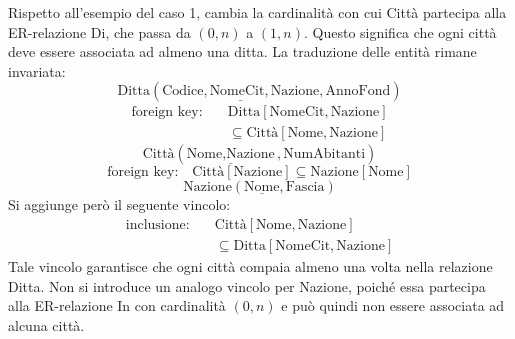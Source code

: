 \noindent
Rispetto all'esempio del caso 1, cambia la
cardinalità con cui Città partecipa alla
ER-relazione Di, che passa da $(0,n)$ a $(1,n)$.
Questo significa che ogni città deve essere
associata ad almeno una ditta.
La traduzione delle entità rimane invariata:
\[
\text{Ditta}(
\underline{\text{Codice},\text{NomeCit},
\text{Nazione}},\text{AnnoFond})
\]
\[
\begin{aligned}
\text{foreign key:}\quad
&\text{Ditta}[\text{NomeCit},\text{Nazione}]\\
&\subseteq
\text{Città}[\text{Nome},\text{Nazione}]
\end{aligned}
\]
\[
\text{Città}(
\underline{\text{Nome},\text{Nazione}},
\text{NumAbitanti})
\]
\[
\text{foreign key:}\quad
\text{Città}[\text{Nazione}]
\subseteq \text{Nazione}[\text{Nome}]
\]
\[
\text{Nazione}(\underline{\text{Nome}},
\text{Fascia})
\]
\noindent
Si aggiunge però il seguente vincolo:
\[
\begin{aligned}
\text{inclusione:}\quad
&\text{Città}[\text{Nome},\text{Nazione}]\\
&\subseteq
\text{Ditta}[\text{NomeCit},\text{Nazione}]
\end{aligned}
\]
\noindent
Tale vincolo garantisce che ogni città compaia
almeno una volta nella relazione Ditta.
Non si introduce un analogo vincolo per
Nazione, poiché essa partecipa alla
ER-relazione In con cardinalità $(0,n)$
e può quindi non essere associata ad alcuna città.

